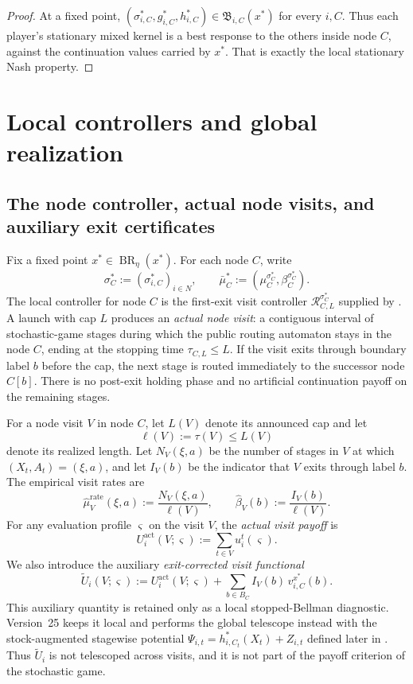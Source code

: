 \documentclass[12pt]{article}
\theoremstyle{definition}
\newcommand{\1}{\mathbf{1}}
\DeclareMathOperator{\BR}{BR}
\begin{document}
\begin{proof}
At a fixed point,
$(\sigma_{i,C}^*,g_{i,C}^*,h_{i,C}^*)\in\mathfrak B_{i,C}(x^*)$ for every $i,C$.
Thus each player's stationary mixed kernel is a best response to the others inside
node $C$, against the continuation values carried by $x^*$. That is exactly the
local stationary Nash property.
\end{proof}


\section{Local controllers and global realization}
\label{sec:realization}

\subsection{The node controller, actual node visits, and auxiliary exit certificates}

Fix a fixed point $x^*\in\BR_\eta(x^*)$. For each node $C$, write
\[
\sigma_C^*:=(\sigma_{i,C}^*)_{i\in N},
\qquad
\bar\mu_C^*:=(\mu_C^{\sigma_C^*},\beta_C^{\sigma_C^*}).
\]
The local controller for node $C$ is the first-exit visit controller
$\mathcal R_{C,L}^{\sigma_C^*}$ supplied by . A
launch with cap $L$ produces an \emph{actual node visit}: a contiguous interval
of stochastic-game stages during which the public routing automaton stays in the
node $C$, ending at the stopping time $\tau_{C,L}\le L$. If the visit exits
through boundary label $b$ before the cap, the next stage is routed immediately
to the successor node $C[b]$. There is no post-exit holding phase and no
artificial continuation payoff on the remaining stages.

For a node visit $V$ in node $C$, let $L(V)$ denote its announced cap and let
\[
\ell(V):=\tau(V)\le L(V)
\]
denote its realized length. Let $N_V(\xi,a)$ be the number of stages in $V$ at
which $(X_t,A_t)=(\xi,a)$, and let $I_V(b)$ be the indicator that $V$ exits
through label $b$. The empirical visit rates are
\[
\widehat\mu_V^{\mathrm{rate}}(\xi,a):=\frac{N_V(\xi,a)}{\ell(V)},
\qquad
\widehat\beta_V(b):=\frac{I_V(b)}{\ell(V)}.
\]
For any evaluation profile $\varsigma$ on the visit $V$, the \emph{actual visit
payoff} is
\begin{equation}
\label{eq:visit-actual-payoff}
U_i^{\mathrm{act}}(V;\varsigma)
:=
\sum_{t\in V} u_i^t(\varsigma).
\end{equation}
We also introduce the auxiliary \emph{exit-corrected visit functional}
\begin{equation}
\label{eq:visit-aux-payoff}
\widetilde U_i(V;\varsigma)
:=
U_i^{\mathrm{act}}(V;\varsigma)
+
\sum_{b\in B_C}I_V(b)\,v_{i,C}^{x^*}(b).
\end{equation}
This auxiliary quantity is retained only as a local stopped-Bellman diagnostic.
Version~25 keeps it local and performs the global telescope instead with the
stock-augmented stagewise potential
$\Psi_{i,t}=h_{i,C_t}^*(X_t)+Z_{i,t}$ defined later in
. Thus $\widetilde U_i$ is not telescoped across visits,
and it is not part of the payoff criterion of the stochastic game.
\end{document}
